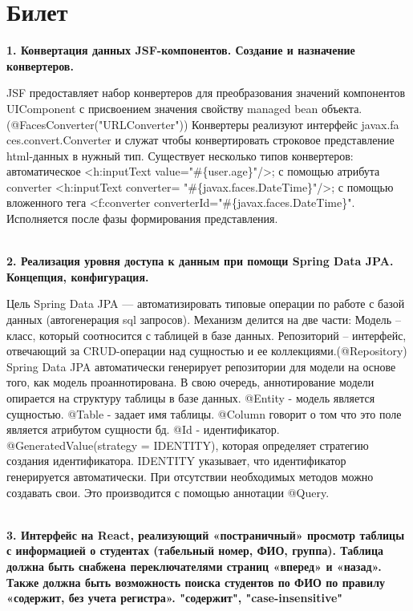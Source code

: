 \documentclass{article}
\newcommand{\bil}[5]{%
        \section{Билет}
        \textbf{1. #1}

        #4
        \\
        \textbf{2. #2}
        
        #5
        \\
        \textbf{3. #3}
}
\begin{document}
\bil{Конвертация данных JSF-компонентов. Создание и назначение конвертеров.}
{Реализация уровня доступа к данным при помощи Spring Data JPA. Концепция, конфигурация.}
{Интерфейс на React, реализующий «постраничный» просмотр таблицы с информацией о студентах (табельный номер, ФИО, группа). Таблица должна быть снабжена переключателями страниц «вперед» и «назад». Также должна быть возможность поиска студентов по ФИО по правилу «содержит, без учета регистра». "содержит", "case-insensitive" }{
    JSF предоставляет набор конвертеров для преобразования значений компонентов UIComponent с присвоением значения свойству managed bean объекта. (@FacesConverter("URLConverter"))
    Конвертеры реализуют интерфейс javax.fa ces.convert.Converter и служат чтобы конвертировать строковое представление html-данных в нужный тип. Существует несколько типов конвертеров: автоматическое <h:inputText value="\#\{user.age\}"/>; с помощью атрибута converter <h:inputText converter= "\#\{javax.faces.DateTime\}"/>;
    с помощью вложенного тега <f:converter converterId="\#\{javax.faces.DateTime\}".
    Исполняется после фазы формирования представления.
}{
    Цель Spring Data JPA — автоматизировать типовые операции по работе с базой данных (автогенерация sql запросов). 
    Механизм делится на две части:
    Модель – класс, который соотносится с таблицей в базе данных.
    Репозиторий – интерфейс, отвечающий за CRUD-операции над сущностью и ее коллекциями.(@Repository)
    Spring Data JPA автоматически генерирует репозитории для модели на основе того, как модель проаннотирована. 
    В свою очередь, аннотирование модели опирается на структуру таблицы в базе данных.
    @Entity - модель является сущностью.
    @Table - задает имя таблицы.
    @Column говорит о том что это поле является атрибутом сущности бд.
    @Id - идентификатор.
    @GeneratedValue(strategy = IDENTITY), которая определяет стратегию создания идентификатора. IDENTITY указывает, что идентификатор генерируется автоматически.
    При отсутствии необходимых методов можно создавать свои. Это производится с помощью аннотации @Query.
}
\end{document}
